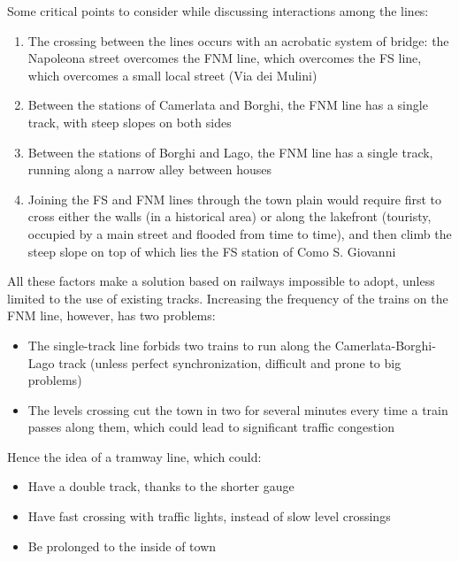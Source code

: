 Some critical points to consider while discussing interactions among the lines: 
\begin{enumerate}
	\item The crossing between the lines occurs with an acrobatic system of bridge: the Napoleona street overcomes the FNM line, which overcomes the FS line, which overcomes a small local street (Via dei Mulini)
	
	\item Between the stations of Camerlata and Borghi, the FNM line has a single track, with steep slopes on both sides
	
	\item Between the stations of Borghi and Lago, the FNM line has a single track, running along a narrow alley between houses
	
	\item Joining the FS and FNM lines through the town plain would require first to cross either the walls (in a historical area) or along the lakefront (touristy, occupied by a main street and flooded from time to time), and then climb the steep slope on top of which lies the FS station of Como S. Giovanni
\end{enumerate}
 
All these factors make a solution based on railways impossible to adopt, unless limited to the use of existing tracks. Increasing the frequency of the trains on the FNM line, however, has two problems: 
\begin{itemize}
	\item The single-track line forbids two trains to run along the Camerlata-Borghi-Lago track (unless perfect synchronization, difficult and prone to big problems)
	
	\item The levels crossing cut the town in two for several minutes every time a train passes along them, which could lead to significant traffic congestion
\end{itemize}

Hence the idea of a tramway line, which could: 
\begin{itemize}
	\item Have a double track, thanks to the shorter gauge
	
	\item Have fast crossing with traffic lights, instead of slow level crossings
	
	\item Be prolonged to the inside of town
\end{itemize}


